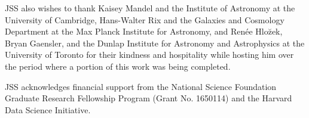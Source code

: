 \documentclass[12pt, titlepage]{article}
\begin{document}
JSS also wishes to thank Kaisey Mandel and
the Institute of Astronomy at the University
of Cambridge, Hans-Walter Rix and
the Galaxies and Cosmology Department at
the Max Planck Institute for Astronomy, and Ren\'{e}e
Hlo\u{z}ek, Bryan Gaensler, and the Dunlap Institute
for Astronomy and Astrophysics at the University of Toronto
for their kindness and hospitality while hosting him over
the period where a portion of this work was being completed.

JSS acknowledges financial support from the National Science Foundation
Graduate Research Fellowship Program (Grant No. 1650114)
and the Harvard Data Science Initiative.





\end{document}
